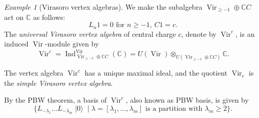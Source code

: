\documentclass[notheorems]{beamer}
\theoremstyle{remark}
\newtheorem{example}{Example}
\DeclareMathOperator{\Vir}{Vir}
\DeclareMathOperator{\Ind}{Ind}
\DeclareMathOperator{\vac}{|0\rangle}
\begin{document}
\begin{frame}
  \begin{example}[Virasoro vertex algebras]
    \label{exa:3}
    We make the subalgebra $\Vir_{\ge -1} \oplus \mathbb{C}C$ act on $\mathbb{C}$ as follows:
    \begin{equation*}
      \text{$L_n1 = 0$ for $n \ge -1$, $C1 = c$}.
    \end{equation*}
    The \emph{universal Virasoro vertex algebra} of central charge $c$, denote by $\Vir^c$, is an induced $\Vir$-module given by
    \begin{equation*}
      \Vir^c = \Ind^{\Vir}_{\Vir_{\ge -1} \oplus \mathbb{C}C}(\mathbb{C}) = U(\Vir) \otimes_{U(\Vir_{\ge -1} \oplus \mathbb{C}C)} \mathbb{C}.
    \end{equation*}

    The vertex algebra $\Vir^c$ has a unique maximal ideal, and the quotient $\Vir_c$ is the \emph{simple Virasoro vertex algebra}.

    By the PBW theorem, a basis of $\Vir^c$, also known as PBW basis, is given by
    \begin{equation*}
      \{L_{-\lambda_1}\dots L_{-\lambda_m}\vac \mid \text{$\lambda = [\lambda_1, \dots, \lambda_m]$ is a partition with $\lambda_m \ge 2$}\}.
    \end{equation*}
  \end{example}
\end{frame}
\end{document}
